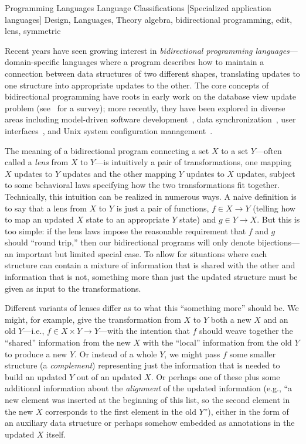 \documentclass{sigplanconf}
\begin{document}
    {Programming Languages}
    {Language Classifications}
    [Specialized application languages]
\terms Design, Languages, Theory
\keywords algebra, bidirectional programming, edit, lens, symmetric


Recent years have seen growing interest in {\em bidirectional
  programming languages}---domain-specific languages where a
program describes how to maintain a connection between data structures
of two different shapes, translating updates to one structure into
appropriate updates to the other.  The core concepts of bidirectional
programming have roots in early work on the database view update
problem (see~\cite{Focal2005} for a survey); more recently, they have
been explored in diverse areas including model-driven software
development~\cite{Stevens07}, data synchronization~\cite{Focal2005},
user interfaces~\cite{Meertens98}, and Unix system configuration
management~\cite{Augeas}.\iflater{}\fi
  
The meaning of a bidirectional program connecting a set $X$ to a set
$Y$---often called a {\em lens} from $X$ to $Y$---is intuitively a
pair of transformations, one mapping $X$ updates to $Y$ updates and
the other mapping $Y$ updates to $X$ updates, subject to some
behavioral laws specifying how the two transformations fit together.
Technically, this intuition can be realized in numerous ways.  A naive
definition is to say that a lens from $X$ to $Y$ is just
a pair of functions, $f \in X \to Y$ (telling how to map an updated
$X$ state to an appropriate $Y$ state) and $g \in Y \to X$.  But this
is too simple: if the lens laws impose the reasonable requirement that
$f$ and $g$ should ``round trip,'' then our bidirectional programs
will only denote bijections---an important but limited special case.
%
To allow for situations where each structure can contain a mixture of
information that is shared with the other and information that is not,
something more than just the updated structure must be given as input
to the transformations.

Different variants of lenses differ as to what this ``something more''
should be.  We might, for example, give the transformation from $X$ to
$Y$ both a new $X$ and an old $Y$---i.e., $f \in X \times Y \to
Y$---with the intention that $f$ should weave together the ``shared''
information from the new $X$ with the ``local'' information from the
old $Y$ to produce a new $Y$.  Or instead of a whole
$Y$, we might pass $f$ some smaller structure (a {\em complement})
representing just 
the information that is needed to build an updated $Y$ out of an
updated $X$.  Or perhaps one of these plus some additional information
about the {\em alignment} of the updated information (e.g., ``a new
element was inserted at the beginning of this list, so the second
element in the new $X$ corresponds to the first element in the old
$Y$''), either in the form of an auxiliary data structure or
perhaps somehow embedded as annotations in the updated $X$ itself.
 
\end{document}
